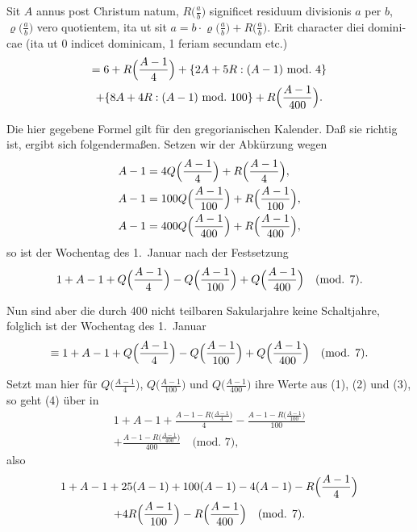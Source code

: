 \documentclass[12pt,a4paper]{article}
\theoremstyle{plain}
\theoremstyle{definition}
\theoremstyle{remark}
\begin{document}
\medskip

\begin{otherlanguage}{latin}
Sit $A$ annus post Christum natum, $R\bigl(\frac{a}{b}\bigr)$ significet residuum divisionis $a$ per $b$, $\varrho\bigl(\frac{a}{b}\bigr)$ vero quotientem, ita ut sit $a = b \cdot \varrho\bigl(\frac{a}{b}\bigr) + R\bigl(\frac{a}{b}\bigr)$. Erit character diei dominicae (ita ut 0 indicet dominicam, 1 feriam secundam etc.)
\begin{multline*}
= 6 + R\Bigl(\frac{A - 1}{4}\Bigr) + \{2A + 5R : (A - 1)\ \text{mod.}\ 4\} \\
+ \{8A + 4R : (A - 1)\ \text{mod.}\ 100\} + R\Bigl(\frac{A - 1}{400}\Bigr).
\end{multline*}
\end{otherlanguage}

Die hier gegebene Formel gilt für den gregorianischen Kalender. Daß sie richtig ist, ergibt sich folgendermaßen. Setzen wir der Abkürzung wegen
\begin{align}
A - 1 &= 4Q\Bigl(\frac{A-1}{4}\Bigr) + R\Bigl(\frac{A-1}{4}\Bigr), \\
A - 1 &= 100Q\Bigl(\frac{A-1}{100}\Bigr) + R\Bigl(\frac{A-1}{100}\Bigr), \\
A - 1 &= 400Q\Bigl(\frac{A-1}{400}\Bigr) + R\Bigl(\frac{A-1}{400}\Bigr),
\end{align}
so ist der Wochentag des 1.~Januar nach der Festsetzung
\begin{equation}
1 + A - 1 + Q\Bigl(\frac{A-1}{4}\Bigr) - Q\Bigl(\frac{A-1}{100}\Bigr) + Q\Bigl(\frac{A-1}{400}\Bigr) \quad \text{(mod. 7)}.
\end{equation}

\newpage

Nun sind aber die durch 400 nicht teilbaren Sakularjahre keine Schaltjahre, folglich ist der Wochentag des 1.~Januar
\begin{equation}
\equiv 1 + A - 1 + Q\Bigl(\frac{A-1}{4}\Bigr) - Q\Bigl(\frac{A-1}{100}\Bigr) + Q\Bigl(\frac{A-1}{400}\Bigr) \quad \text{(mod. 7)}.
\end{equation}

Setzt man hier für $Q\bigl(\frac{A-1}{4}\bigr)$, $Q\bigl(\frac{A-1}{100}\bigr)$ und $Q\bigl(\frac{A-1}{400}\bigr)$ ihre Werte aus (1), (2) und (3), so geht (4) über in
\begin{multline}
1 + A - 1 + \frac{A - 1 - R\bigl(\frac{A-1}{4}\bigr)}{4} - \frac{A - 1 - R\bigl(\frac{A-1}{100}\bigr)}{100} \\
+ \frac{A - 1 - R\bigl(\frac{A-1}{400}\bigr)}{400} \quad \text{(mod. 7)},
\end{multline}
also
\begin{multline}
1 + A - 1 + 25(A - 1) + 100(A - 1) - 4(A - 1) - R\Bigl(\frac{A-1}{4}\Bigr) \\
+ 4R\Bigl(\frac{A-1}{100}\Bigr) - R\Bigl(\frac{A-1}{400}\Bigr) \quad \text{(mod. 7)}.
\end{multline}
\end{document}
